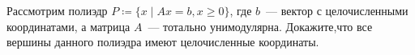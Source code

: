 Рассмотрим полиэдр $P \coloneqq \{x \mid Ax = b, x \ge 0\}$, где $b$~--- вектор с целочисленными
координатами, а матрица $A$~--- тотально унимодулярна. Докажите,что все вершины данного полиэдра имеют
целочисленные координаты.

